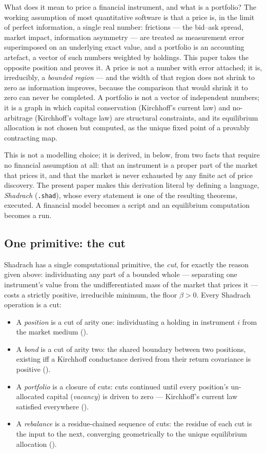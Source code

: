 \documentclass[11pt,a4paper]{article}
\theoremstyle{thmstyle}
\theoremstyle{definition}
\theoremstyle{remark}
\newcommand{\flo}{\beta}
\newcommand{\sh}[1]{\texttt{#1}}
\begin{document}
What does it mean to price a financial instrument, and what is a
portfolio? The working assumption of most quantitative software is that
a price is, in the limit of perfect information, a single real number:
frictions --- the bid--ask spread, market impact, information asymmetry
--- are treated as measurement error superimposed on an underlying exact
value, and a portfolio is an accounting artefact, a vector of such
numbers weighted by holdings. This paper takes the opposite position and
proves it. A price is not a number with error attached; it is,
irreducibly, a \emph{bounded region} --- and the width of that region
does not shrink to zero as information improves, because the comparison
that would shrink it to zero can never be completed. A portfolio is not
a vector of independent numbers; it is a graph in which capital
conservation (Kirchhoff's current law) and no-arbitrage (Kirchhoff's
voltage law) are structural constraints, and its equilibrium allocation
is not chosen but computed, as the unique fixed point of a provably
contracting map.

This is not a modelling choice; it is derived, in 
below, from two facts that require no financial assumption at all: that
an instrument is a proper part of the market that prices it, and that
the market is never exhausted by any finite act of price discovery. The
present paper makes this derivation literal by defining a language,
\emph{Shadrach} (\sh{.shad}), whose every statement is one of the
resulting theorems, executed. A financial model becomes a script and an
equilibrium computation becomes a run.

\subsection{One primitive: the cut}

Shadrach has a single computational primitive, the \emph{cut}, for
exactly the reason given above: individuating any part of a bounded
whole --- separating one instrument's value from the undifferentiated
mass of the market that prices it --- costs a strictly positive,
irreducible minimum, the floor $\flo>0$. Every Shadrach operation is a
cut:

\begin{itemize}[leftmargin=1.4em,itemsep=2pt]
\item A \emph{position} is a cut of arity one: individuating a holding
in instrument $i$ from the market medium ().
\item A \emph{bond} is a cut of arity two: the shared boundary between
two positions, existing iff a Kirchhoff conductance derived from their
return covariance is positive ().
\item A \emph{portfolio} is a closure of cuts: cuts continued until
every position's un-allocated capital (\emph{vacancy}) is driven to
zero --- Kirchhoff's current law satisfied everywhere
().
\item A \emph{rebalance} is a residue-chained sequence of cuts: the
residue of each cut is the input to the next, converging geometrically
to the unique equilibrium allocation ().
\end{itemize}
\end{document}
